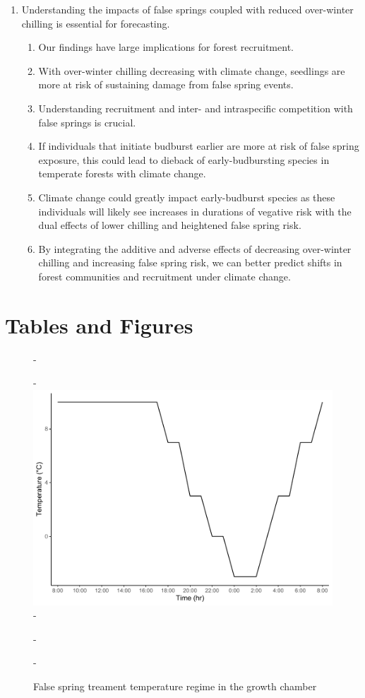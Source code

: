 \documentclass{article}\usepackage[]{graphicx}\usepackage[]{color}
\begin{document}
\begin{enumerate}
\item Understanding the impacts of false springs coupled with reduced over-winter chilling is essential for forecasting.
  \begin{enumerate}
  \item Our findings have large implications for forest recruitment.
  \item With over-winter chilling decreasing with climate change, seedlings are more at risk of sustaining damage from false spring events. 
  \item Understanding recruitment and inter- and intraspecific competition with false springs is crucial. 
  \item If individuals that initiate budburst earlier are more at risk of false spring exposure, this could lead to dieback of early-budbursting species in temperate forests with climate change. 
  \item Climate change could greatly impact early-budburst species as these individuals will likely see increases in durations of vegative risk with the dual effects of lower chilling and heightened false spring risk. 
  \item By integrating the additive and adverse effects of decreasing over-winter chilling and increasing false spring risk, we can better predict shifts in forest communities and recruitment under climate change. 
  \end{enumerate}
\end{enumerate}






\section*{Tables and Figures}

{\begin{figure} [H]
  -\begin{center}
  -\includegraphics[width=12cm]{..//analyses/figures/growthchamber.pdf}
  -\caption{False spring treament temperature regime in the growth chamber}\label{fig:gccond}
  -\end{center}
  -\end{figure}}
\end{document}
